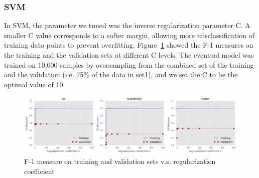 \documentclass[11pt]{article}
\begin{document}
\subsubsection{SVM}
In SVM, the parameter we tuned was the inverse regularization parameter C. A smaller C value corresponds to a softer margin, allowing more misclassification of training data points to prevent overfitting. Figure~\ref{fig:mid_f1} showed the F-1 measures on the training and the validation sets at different C levels. The eventual model was trained on 10,000 samples by oversampling from the combined set of the training and the validation (i.e. 75\% of the data in set1), and we set the C to be the optimal value of 10.
\begin{figure}[H]
\centering
\includegraphics [width=0.9\linewidth,height=0.22\linewidth]{./figures/svm_mid_f1.png}
\caption{F-1 measure on training and validation sets v.s. regularization coefficient}
\label{fig:mid_f1}
\end{figure}
\end{document}
